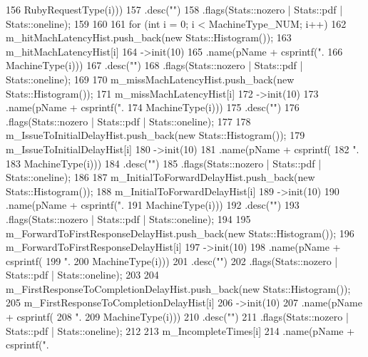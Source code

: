 \begin{DoxyCode}
{{156                                     RubyRequestType(i)))
157             .desc("")
158             .flags(Stats::nozero | Stats::pdf | Stats::oneline);
159     }
160 
161     for (int i = 0; i < MachineType_NUM; i++) {
162         m_hitMachLatencyHist.push_back(new Stats::Histogram());
163         m_hitMachLatencyHist[i]
164             ->init(10)
165             .name(pName + csprintf(".%
166                                     MachineType(i)))
167             .desc("")
168             .flags(Stats::nozero | Stats::pdf | Stats::oneline);
169 
170         m_missMachLatencyHist.push_back(new Stats::Histogram());
171         m_missMachLatencyHist[i]
172             ->init(10)
173             .name(pName + csprintf(".%
174                                     MachineType(i)))
175             .desc("")
176             .flags(Stats::nozero | Stats::pdf | Stats::oneline);
177 
178         m_IssueToInitialDelayHist.push_back(new Stats::Histogram());
179         m_IssueToInitialDelayHist[i]
180             ->init(10)
181             .name(pName + csprintf(
182                 ".%
183                 MachineType(i)))
184             .desc("")
185             .flags(Stats::nozero | Stats::pdf | Stats::oneline);
186 
187         m_InitialToForwardDelayHist.push_back(new Stats::Histogram());
188         m_InitialToForwardDelayHist[i]
189             ->init(10)
190             .name(pName + csprintf(".%
191                                    MachineType(i)))
192             .desc("")
193             .flags(Stats::nozero | Stats::pdf | Stats::oneline);
194 
195         m_ForwardToFirstResponseDelayHist.push_back(new Stats::Histogram());
196         m_ForwardToFirstResponseDelayHist[i]
197             ->init(10)
198             .name(pName + csprintf(
199                 ".%
200                 MachineType(i)))
201             .desc("")
202             .flags(Stats::nozero | Stats::pdf | Stats::oneline);
203 
204         m_FirstResponseToCompletionDelayHist.push_back(new Stats::Histogram());
205         m_FirstResponseToCompletionDelayHist[i]
206             ->init(10)
207             .name(pName + csprintf(
208                 ".%
209                 MachineType(i)))
210             .desc("")
211             .flags(Stats::nozero | Stats::pdf | Stats::oneline);
212 
213         m_IncompleteTimes[i]
214             .name(pName + csprintf(".%
}}
\end{DoxyCode}
